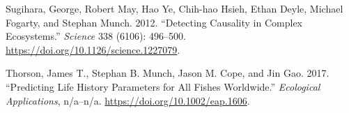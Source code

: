 \documentclass[]{article}
\begin{document}
\leavevmode\hypertarget{ref-sugihara2012}{}%
Sugihara, George, Robert May, Hao Ye, Chih-hao Hsieh, Ethan Deyle, Michael Fogarty, and Stephan Munch. 2012. ``Detecting Causality in Complex Ecosystems.'' \emph{Science} 338 (6106): 496--500. \url{https://doi.org/10.1126/science.1227079}.

\leavevmode\hypertarget{ref-thorson2017c}{}%
Thorson, James T., Stephan B. Munch, Jason M. Cope, and Jin Gao. 2017. ``Predicting Life History Parameters for All Fishes Worldwide.'' \emph{Ecological Applications}, n/a--n/a. \url{https://doi.org/10.1002/eap.1606}.
\end{document}
